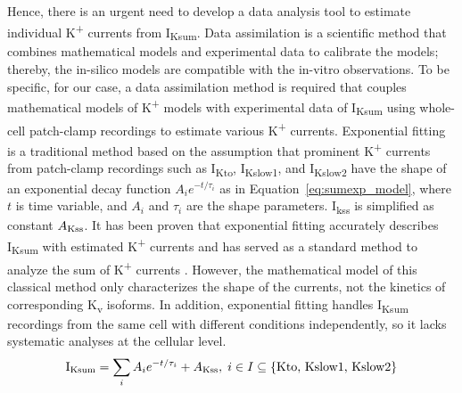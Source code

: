 \documentclass[utf8]{frontiersHLTH} %
\begin{document}
Hence, there is an urgent need to develop a data analysis tool to estimate individual K\textsuperscript{+} currents from I\textsubscript{Ksum}. Data assimilation is a scientific method that combines mathematical models and experimental data to calibrate the models; thereby, the in-silico models are compatible with the in-vitro observations. To be specific, for our case, a data assimilation method is required that couples mathematical models of K\textsuperscript{+} models with experimental data of I\textsubscript{Ksum} using whole-cell patch-clamp recordings to estimate various K\textsuperscript{+} currents. Exponential fitting is a traditional method based on the assumption that prominent K\textsuperscript{+} currents from patch-clamp recordings such as I\textsubscript{Kto}, I\textsubscript{Kslow1}, and I\textsubscript{Kslow2} have the shape of an exponential decay function $A_{i}e^{-t/\tau_{i}}$ as in Equation~\ref{eq:sumexp_model}, where $t$ is time variable, and $A_{i}$ and $\tau_{i}$ are the shape parameters. I\textsubscript{kss} is simplified as constant $A\textsubscript{Kss}$. It has been proven that exponential fitting accurately describes I\textsubscript{Ksum} with estimated K\textsuperscript{+} currents and has served as a standard method to analyze the sum of K\textsuperscript{+} currents \cite{brunet2004heterogeneous, liu2011dissection}. However, the mathematical model of this classical method only characterizes the shape of the currents, not the kinetics of corresponding K\textsubscript{v} isoforms. In addition, exponential fitting handles I\textsubscript{Ksum} recordings from the same cell with different conditions independently, so it lacks systematic analyses at the cellular level. 
\begin{equation}
    \text{I}\textsubscript{Ksum} = \sum_{i} A_{i} e^{-t/\tau_{i}} + A\textsubscript{Kss}, \; i \in I \subseteq \{\text{Kto, } \text{Kslow1, } \text{Kslow2}\} \label{eq:sumexp_model}
\end{equation}
\end{document}
